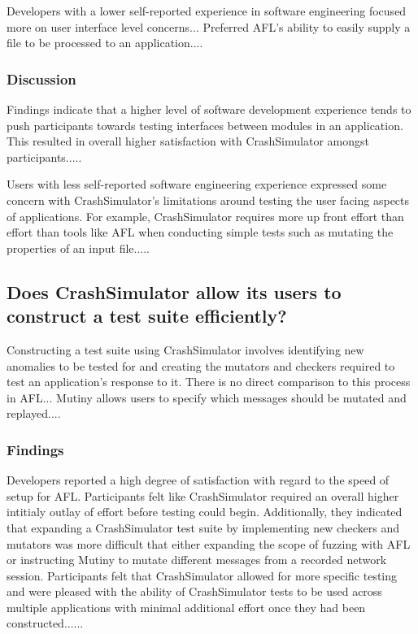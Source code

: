 Developers with a lower self-reported experience in software engineering
focused more on user interface level concerns...  Preferred AFL's ability
to easily supply a file to be processed to an application....


\subsubsection{Discussion}

Findings indicate that a higher level of software development experience
tends to push participants towards testing interfaces between modules in an
application.  This resulted in overall higher satisfaction with
CrashSimulator amongst participants.....

Users with less self-reported software engineering experience expressed
some concern with CrashSimulator's limitations around testing the user
facing aspects of applications.  For example, CrashSimulator requires more
up front effort than effort than tools like AFL when conducting simple
tests such as mutating the properties of an input file.....


\subsection{Does CrashSimulator allow its users to construct a test suite
efficiently?}

Constructing a test suite using CrashSimulator involves identifying new
anomalies to be tested for and creating the mutators and checkers required
to test an application's response to it.  There is no direct comparison to
this process in AFL...  Mutiny allows users to specify which messages
should be mutated and replayed....


\subsubsection{Findings}

Developers reported a high degree of satisfaction with regard to the speed
of setup for AFL.  Participants felt like CrashSimulator required an
overall higher intitialy outlay of effort before testing could begin.
Additionally, they indicated that expanding a CrashSimulator test suite by
implementing new checkers and mutators was more difficult that either
expanding the scope of fuzzing with AFL or instructing Mutiny to mutate
different messages from a recorded network session.  Participants felt that
CrashSimulator allowed for more specific testing and were pleased with the
ability of CrashSimulator tests to be used across multiple applications
with minimal additional effort once they had been constructed......


